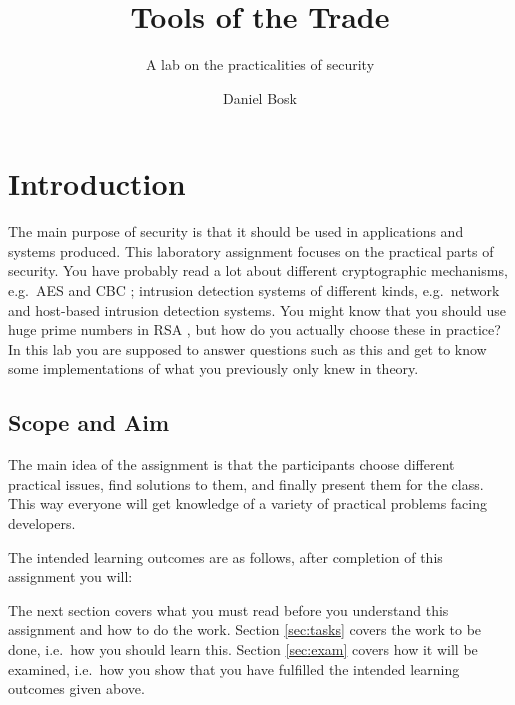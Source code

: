\title{Tools of the Trade}
\subtitle{A lab on the practicalities of security}

\author{%
  Daniel Bosk
}

\maketitle

\section{Introduction}
\label{sec:intro}
The main purpose of security is that it should be used in applications and 
systems produced.
This laboratory assignment focuses on the practical parts of security.
You have probably read a lot about different cryptographic mechanisms, e.g.~AES 
\cite{aes} and CBC \cite{blockmodes}; intrusion detection systems of different 
kinds, e.g.~network \cite{snort} and host-based \cite{ossec} intrusion 
detection systems.
You might know that you should use huge prime numbers in RSA \cite{rsa}, but 
how do you actually choose these in practice?
In this lab you are supposed to answer questions such as this and get to know 
some implementations of what you previously only knew in theory.

\subsection{Scope and Aim}
\label{sec:aim}
The main idea of the assignment is that the participants choose different 
practical issues, find solutions to them, and finally present them for the 
class.
This way everyone will get knowledge of a variety of practical problems facing 
developers.

The intended learning outcomes are as follows, after completion of this 
assignment you will:
\begin{itemize}
    
\end{itemize}

The next section covers what you must read before you understand this 
assignment and how to do the work.
Section \ref{sec:tasks} covers the work to be done, i.e.~how you should learn 
this.
Section \ref{sec:exam} covers how it will be examined, i.e.~how you show that 
you have fulfilled the intended learning outcomes given above.


